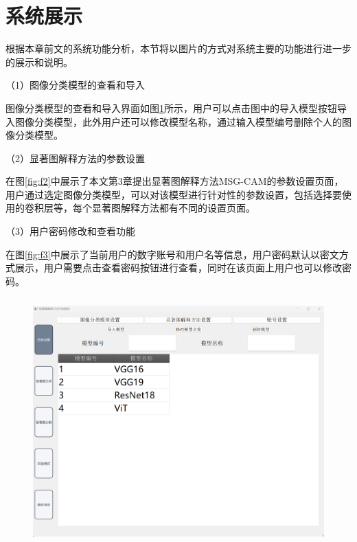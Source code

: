 \section{系统展示}
根据本章前文的系统功能分析，本节将以图片的方式对系统主要的功能进行进一步的展示和说明。

（1）图像分类模型的查看和导入

图像分类模型的查看和导入界面如图\ref{fig:f1}所示，用户可以点击图中的导入模型按钮导入图像分类模型，此外用户还可以修改模型名称，通过输入模型编号删除个人的图像分类模型。

（2）显著图解释方法的参数设置

在图\ref{fig:f2}中展示了本文第3章提出显著图解释方法MSG-CAM的参数设置页面，用户通过选定图像分类模型，可以对该模型进行针对性的参数设置，包括选择要使用的卷积层等，每个显著图解释方法都有不同的设置页面。


（3）用户密码修改和查看功能

在图\ref{fig:f3}中展示了当前用户的数字账号和用户名等信息，用户密码默认以密文方式展示，用户需要点击查看密码按钮进行查看，同时在该页面上用户也可以修改密码。
\begin{figure}[H]
	\centering 
	\includegraphics[width=15cm,height=9.5cm]{fig/ch5/f1.png}
	\label{fig:f1}
\end{figure}

